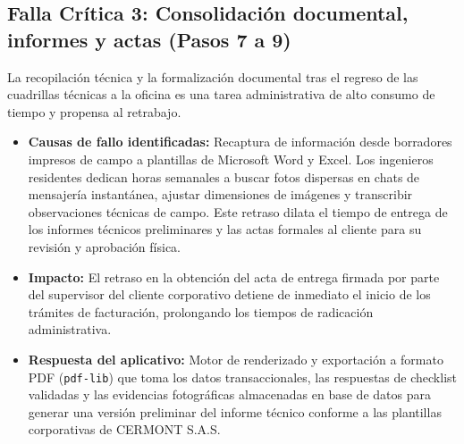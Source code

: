 \subsection{Falla Crítica 3: Consolidación documental, informes y actas (Pasos 7 a 9)}
La recopilación técnica y la formalización documental tras el regreso de las cuadrillas técnicas a la oficina es una tarea administrativa de alto consumo de tiempo y propensa al retrabajo.
\begin{itemize}
    \item \textbf{Causas de fallo identificadas:} Recaptura de información desde borradores impresos de campo a plantillas de Microsoft Word y Excel. Los ingenieros residentes dedican horas semanales a buscar fotos dispersas en chats de mensajería instantánea, ajustar dimensiones de imágenes y transcribir observaciones técnicas de campo. Este retraso dilata el tiempo de entrega de los informes técnicos preliminares y las actas formales al cliente para su revisión y aprobación física.
    \item \textbf{Impacto:} El retraso en la obtención del acta de entrega firmada por parte del supervisor del cliente corporativo detiene de inmediato el inicio de los trámites de facturación, prolongando los tiempos de radicación administrativa.
    \item \textbf{Respuesta del aplicativo:} Motor de renderizado y exportación a formato PDF (\texttt{pdf-lib}) que toma los datos transaccionales, las respuestas de checklist validadas y las evidencias fotográficas almacenadas en base de datos para generar una versión preliminar del informe técnico conforme a las plantillas corporativas de CERMONT S.A.S.
\end{itemize}

